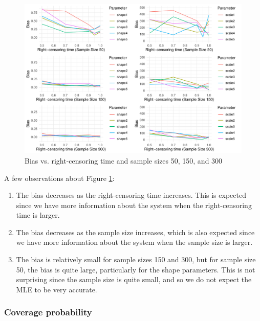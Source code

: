 \documentclass[
]{article}
\begin{document}
\begin{figure}

{\centering \includegraphics{image/plot-bias-tau-vs-sample-size-50-150-300} 

}

\caption{Bias vs. right-censoring time and sample sizes 50, 150, and 300}\label{fig:plot-bias-tau-vs-sample-size-50-150-300}
\end{figure}

A few observations about Figure
\ref{fig:plot-bias-tau-vs-sample-size-50-150-300}:

\begin{enumerate}
\def\labelenumi{\arabic{enumi}.}
\item
  The bias decreases as the right-censoring time increases. This is
  expected since we have more information about the system when the
  right-censoring time is larger.
\item
  The bias decreases as the sample size increases, which is also
  expected since we have more information about the system when the
  sample size is larger.
\item
  The bias is relatively small for sample sizes 150 and 300, but for
  sample size 50, the bias is quite large, particularly for the shape
  parameters. This is not surprising since the sample size is quite
  small, and so we do not expect the MLE to be very accurate.
\end{enumerate}

\hypertarget{sec:coverage_prob}{%
\subsubsection{Coverage probability}\label{sec:coverage_prob}}
\end{document}
